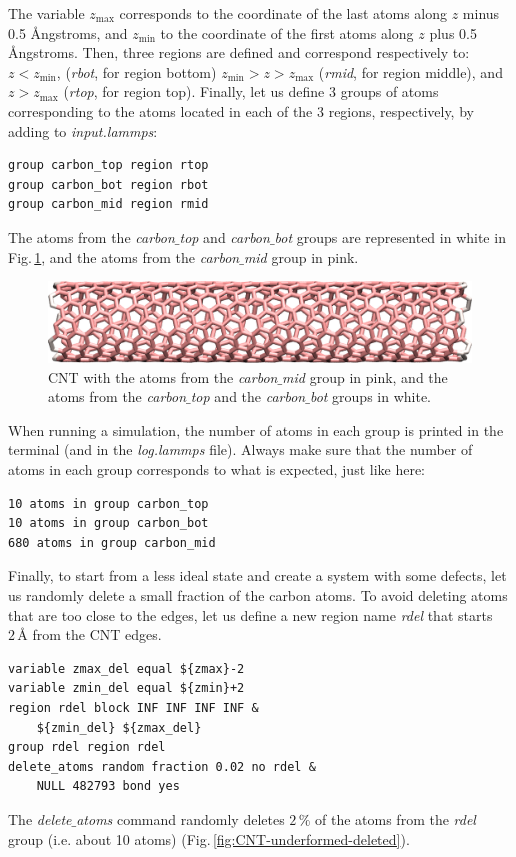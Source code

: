 \documentclass[9pt,tutorial]{livecoms}
\begin{document}
\noindent The variable $z_\mathrm{max}$ corresponds to the coordinate of the last atoms along $z$ minus 0.5 Ångstroms, and $z_\mathrm{min}$ to the coordinate of the first atoms along $z$ plus 0.5 Ångstroms. Then, three regions are defined and correspond respectively to: $z < z_\mathrm{min}$, (\textit{rbot}, for region bottom) $z_\mathrm{min} > z > z_\mathrm{max}$ (\textit{rmid}, for region middle), and $z > z_\mathrm{max}$ (\textit{rtop}, for region top). Finally, let us define 3 groups of atoms corresponding to the atoms located in each of the 3 regions, respectively, by adding to \textit{input.lammps}:
{\normalsize \begin{verbatim}
group carbon_top region rtop
group carbon_bot region rbot
group carbon_mid region rmid
\end{verbatim}}
The atoms from the \textit{carbon$\_$top} and \textit{carbon$\_$bot} groups are represented in white in Fig.\,\ref{fig:CNT-underformed}, and the atoms from the \textit{carbon$\_$mid} group in pink.

\begin{figure}
\centering
\includegraphics[width=\linewidth]{CNT-underformed}
\caption{CNT with the atoms from the \textit{carbon$\_$mid} group in pink, and the atoms from the \textit{carbon$\_$top} and the \textit{carbon$\_$bot} groups in white.}
\label{fig:CNT-underformed}
\end{figure}

When running a simulation, the number of atoms in each group is printed in the terminal (and in the \textit{log.lammps} file). Always make sure that the number of atoms in each group corresponds to what is expected, just like here:
{\normalsize \begin{verbatim}
10 atoms in group carbon_top
10 atoms in group carbon_bot
680 atoms in group carbon_mid
\end{verbatim}}
Finally, to start from a less ideal state and create a system with some defects, 
let us randomly delete a small fraction of the carbon atoms. To avoid deleting atoms that are too close to the edges, let us define a new region name \textit{rdel} that starts $2\,\text{\AA{}}$ from the CNT edges.
{\normalsize \begin{verbatim}
variable zmax_del equal ${zmax}-2
variable zmin_del equal ${zmin}+2
region rdel block INF INF INF INF &
    ${zmin_del} ${zmax_del}
group rdel region rdel
delete_atoms random fraction 0.02 no rdel &
    NULL 482793 bond yes
\end{verbatim}}
The \textit{delete$\_$atoms} command randomly deletes $2\,\%$ of the atoms from the \textit{rdel} group (i.e. about 10 atoms) (Fig.\,\ref{fig:CNT-underformed-deleted}).
\end{document}
